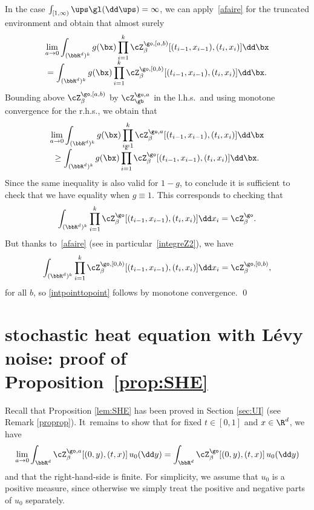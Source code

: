 In the case $\int_{[1,\infty)} \ups \gl(\dd \ups)=\infty$, we can apply~\eqref{afaire} for the truncated environment and obtain
that almost surely\vspace*{-5pt}
\begin{multline}\label{afaire1}
\lim_{a\to 0} \int_{(\bbR^d)^k} g(\bx)\prod_{i=1}^k \cZ^{\go,[a,b)}_{\beta}[(t_{i-1},x_{i-1}),(t_i,x_{i})] \dd \bx \\[-5pt]
 = \int_{(\bbR^d)^k} g(\bx)\prod_{i=1}^k \cZ^{\go,[0,b)}_{\beta}[(t_{i-1},x_{i-1}),(t_i,x_{i})] \dd \bx.
\end{multline}
Bounding above $\cZ^{\go,[a,b)}_{\beta}$ by $\cZ^{\go,a}_{\gb}$
in the l.h.s.\ and using monotone convergence for the r.h.s., we obtain that\vspace*{-5pt}
\begin{multline}\label{afaire2}
\lim_{a\to 0} \int_{(\bbR^d)^k} g(\bx)\prod_{i=1}^k \cZ^{\go,a}_{\beta}[(t_{i-1},x_{i-1}),(t_i,x_{i})] \dd \bx \\[-8pt]
\ge \int_{(\bbR^d)^k} g(\bx)\prod_{i=1}^k \cZ^{\go}_{\beta}[(t_{i-1},x_{i-1}),(t_i,x_{i})] \dd \bx.
\end{multline}
Since the same inequality is also valid for $1-g$, to conclude it is sufficient to check that we have equality when $g\equiv 1$. This corresponds to checking that
\begin{equation}
\label{intpointtopoint}
\int_{(\bbR^d)^k} \prod_{i=1}^k \cZ^{\go}_{\beta}[(t_{i-1},x_{i-1}),(t_i,x_{i})] \dd x_i=
\cZ^{\go}_\beta.
\end{equation}
But thanks to~\eqref{afaire} (see in particular~\eqref{integreZ2}), we have
\begin{equation*}
\int_{(\bbR^d)^k} \prod_{i=1}^k \cZ^{\go,[0,b)}_{\beta}[(t_{i-1},x_{i-1}),(t_i,x_{i})] \dd x_i=
\cZ^{\go,[0,b)}_\beta,
\end{equation*}
for all $b$, so \eqref{intpointtopoint} follows by monotone convergence.
\qed

\section{stochastic heat equation with Lévy noise: proof of Proposition~\ref{prop:SHE}}
\label{sec:propSHE}

Recall that Proposition \ref{lem:SHE} has been proved in Section \ref{sec:UI} (see Remark \ref{proprop}).
It~remains to show that for fixed $t \in [0,1]$ and $x\in \R^d$,
we have
\begin{equation}
\label{gogoal}
\lim_{a\to 0} \int_{\bbR^d}
\cZ^{\go,a}_{\beta}[(0,y),(t,x)] \, u_0(\dd y)
= \int_{\bbR^d}
\cZ^{\go}_{\beta}[(0,y),(t,x)] \, u_0(\dd y)
\end{equation}
and that the right-hand-side is finite.
For simplicity, we assume that $u_0$ is a positive measure,
since otherwise
we simply treat the positive and negative parts of $u_0$ separately.

